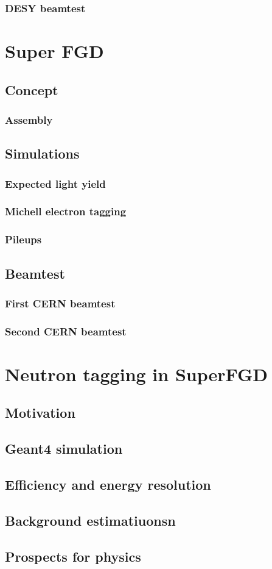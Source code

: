\documentclass[../main.tex]{subfiles}
\begin{document}
\subsection{DESY beamtest}


\chapter{Super FGD}
\section{Concept}
\subsection{Assembly}
\section{Simulations}
\subsection{Expected light yield}
\subsection{Michell electron tagging}
\subsection{Pileups}
\section{Beamtest}
\subsection{First CERN beamtest}
\subsection{Second CERN beamtest}

\chapter{Neutron tagging in SuperFGD}
\section{Motivation}
\section{Geant4 simulation}
\section{Efficiency and energy resolution}
\section{Background estimatiuonsn}
\section{Prospects for physics}
\end{document}

